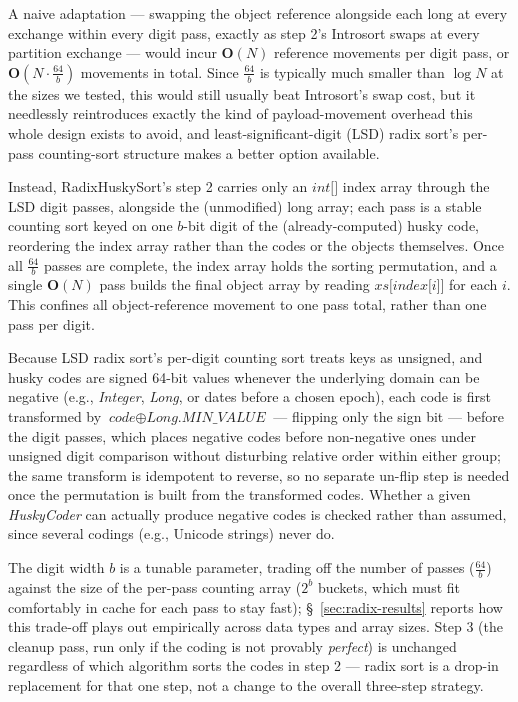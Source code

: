 \documentclass[twoside,leqno,twocolumn]{article}
\begin{document}
A naive adaptation — swapping the object reference alongside each long at every exchange within every digit pass,
exactly as step 2's Introsort swaps at every partition exchange —
would incur $\textbf{O}(N)$ reference movements per digit pass, or $\textbf{O}(N \cdot \frac{64}{b})$ movements in total.
Since $\frac{64}{b}$ is typically much smaller than $\log N$ at the sizes we tested,
this would still usually beat Introsort's swap cost,
but it needlessly reintroduces exactly the kind of payload-movement overhead this whole design exists to avoid,
and least-significant-digit (LSD) radix sort's per-pass counting-sort structure makes a better option available.

Instead, RadixHuskySort's step 2 carries only an $\textit{int[]}$ index array through the LSD digit passes,
alongside the (unmodified) long array;
each pass is a stable counting sort keyed on one $b$-bit digit of the (already-computed) husky code,
reordering the index array rather than the codes or the objects themselves.
Once all $\frac{64}{b}$ passes are complete, the index array holds the sorting permutation,
and a single $\textbf{O}(N)$ pass builds the final object array by reading $\textit{xs[index[i]]}$ for each $i$.
This confines all object-reference movement to one pass total, rather than one pass per digit.

Because LSD radix sort's per-digit counting sort treats keys as unsigned,
and husky codes are signed 64-bit values whenever the underlying domain can be negative (e.g., \textit{Integer},
\textit{Long}, or dates before a chosen epoch), each code is first transformed by $\textit{code} \oplus \textit{Long.MIN\_VALUE}$ —
flipping only the sign bit — before the digit passes,
which places negative codes before non-negative ones under unsigned digit comparison without disturbing relative order within either group;
the same transform is idempotent to reverse, so no separate un-flip step is needed once the permutation is built from the transformed codes.
Whether a given \textit{HuskyCoder} can actually produce negative codes is checked rather than assumed,
since several codings (e.g., Unicode strings) never do.

The digit width $b$ is a tunable parameter, trading off the number of passes ($\frac{64}{b}$)
against the size of the per-pass counting array ($2^b$ buckets, which must fit comfortably in cache for each pass to stay fast);
\S~\ref{sec:radix-results} reports how this trade-off plays out empirically across data types and array sizes.
Step 3 (the cleanup pass, run only if the coding is not provably \textit{perfect})
is unchanged regardless of which algorithm sorts the codes in step 2 —
radix sort is a drop-in replacement for that one step, not a change to the overall three-step strategy.
\end{document}
